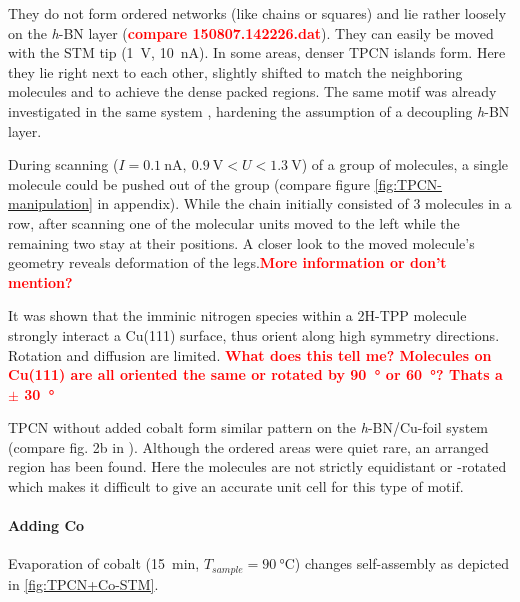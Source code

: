   They do not form ordered networks (like chains or squares) and lie rather loosely on the \textit{h}-BN layer (\textcolor{red}{\textbf{compare 150807.142226.dat}}). They can easily be moved with the STM tip (\SI{1}{\volt}, \SI{10}{\nano \ampere}). In some areas, denser TPCN islands form. Here they lie right next to each other, slightly shifted to match the neighboring molecules and to achieve the dense packed regions. The same motif was already investigated in the same system \cite{urgel_controlling_2015}, hardening the assumption of a decoupling \textit{h}-BN layer.
  
  During scanning ($I=\SI{0.1}{\nA},\ \SI{0.9}{\V}<U<\SI{1.3}{\V}$) of a group of molecules, a single molecule could be pushed out of the group (compare figure \autoref{fig:TPCN-manipulation} in appendix). While the chain initially consisted of 3 molecules in a row, after scanning one of the molecular units moved to the left while the remaining two stay at their positions. A closer look to the moved molecule's geometry reveals deformation of the legs.\textcolor{red}{\textbf{More information or don't mention?}}
  
  It was shown that the imminic nitrogen species within a 2H-TPP molecule strongly interact a Cu(111) surface, thus orient along high symmetry directions.\cite{haq_clean_2011, buchner_diffusion_2011, gonzalez-moreno_following_2011, diller_self-metalation_2012, ditze_activation_2012,rojas_self-assembly_2010} 
  Rotation and diffusion are limited. \textcolor{red}{\textbf{What does this tell me? Molecules on Cu(111) are all oriented the same or rotated by \SI{90}{\degree} or \SI{60}{\degree}? Thats a $\pm$ \SI{30}{\degree}}}
 
 TPCN without added cobalt form similar pattern on the \textit{h}-BN/Cu-foil system (compare fig. 2b in \cite{urgel_controlling_2015}). Although the ordered areas were quiet rare, an arranged region has been found. Here the molecules are not strictly equidistant or -rotated which makes it difficult to give an accurate unit cell for this type of motif.
  
  \paragraph{Adding Co}
  Evaporation of cobalt (\SI{15}{\minute}, $T_{sample}=\SI{90}{\celsius}$) changes self-assembly as depicted in \autoref{fig:TPCN+Co-STM}. 
  
